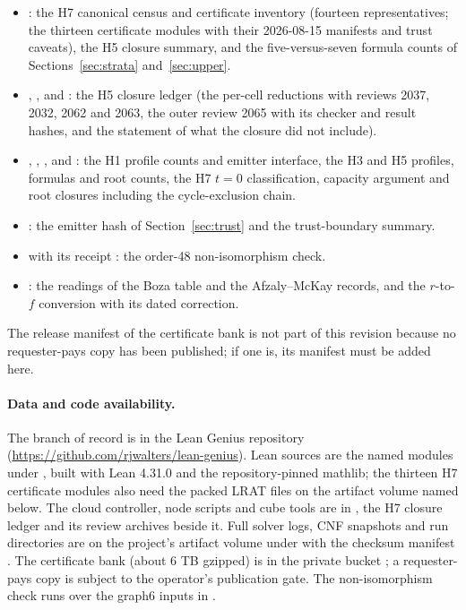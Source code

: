\documentclass{anvil-paper}
\theoremstyle{definition}
\begin{document}
\begin{itemize}
\item {}: the H7 canonical census and certificate inventory (fourteen representatives; the thirteen certificate modules with their 2026-08-15 manifests and trust caveats), the H5 closure summary, and the five-versus-seven formula counts of Sections~\ref{sec:strata} and~\ref{sec:upper}.
\item {}, ,  and : the H5 closure ledger (the per-cell reductions with reviews 2037, 2032, 2062 and 2063, the outer review 2065 with its checker and result hashes, and the statement of what the closure did not include).
\item {}, , ,  and : the H1 profile counts and emitter interface, the H3 and H5 profiles, formulas and root counts, the H7 $t=0$ classification, capacity argument and root closures including the cycle-exclusion chain.
\item {}: the  emitter hash of Section~\ref{sec:trust} and the trust-boundary summary.
\item {} with its receipt : the order-48 non-isomorphism check.
\item {}: the readings of the Boza table and the Afzaly--McKay records, and the $r$-to-$f$ conversion with its dated correction.
\end{itemize}
The release manifest of the certificate bank is not part of this revision because no requester-pays copy has been published; if one is, its manifest must be added here.

\paragraph{Data and code availability.} The branch of record is  in the Lean Genius repository (\url{https://github.com/rjwalters/lean-genius}). Lean sources are the named modules under , built with Lean 4.31.0 and the repository-pinned mathlib; the thirteen H7 certificate modules also need the packed LRAT files on the artifact volume named below. The cloud controller, node scripts and cube tools are in , the H7 closure ledger and its review archives beside it. Full solver logs, CNF snapshots and run directories are on the project's artifact volume under  with the checksum manifest . The certificate bank (about 6 TB gzipped) is in the private bucket ; a requester-pays copy is subject to the operator's publication gate. The non-isomorphism check runs over the graph6 inputs in .
\end{document}

